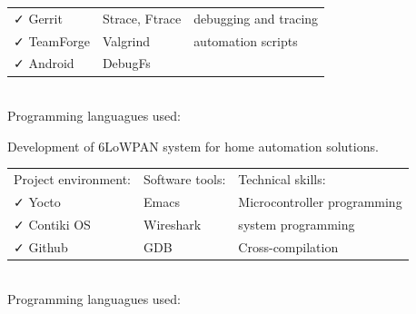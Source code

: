\documentclass[letterpaper]{jm-cv} %
\begin{document}
{\begin{tabular}{ l l l }
  {\color{mainblue}\faCheck} Gerrit &
  \hspace{1cm}{\color{maingreen}\faCheck} Strace, Ftrace &
  \hspace{1cm}{\color{maingray}\faCheck} debugging and tracing\\

  {\color{mainblue}\faCheck} TeamForge &
  \hspace{1cm}{\color{maingreen}\faCheck} Valgrind &
  \hspace{1cm}{\color{maingray}\faCheck} automation scripts \\

  {\color{mainblue}\faCheck} Android &
  \hspace{1cm}{\color{maingreen}\faCheck} DebugFs &

\end{tabular}\\

Programming languagues used:\\
}

\divider


\small {

  Development of 6LoWPAN system for home automation solutions.

\begin{tabular}{ l l l }
  Project environment: & \hspace{1cm}Software tools: & \hspace{1cm}Technical skills:\\
  {\color{mainblue}\faCheck} Yocto &
  \hspace{1cm}{\color{maingreen}\faCheck} Emacs &
  \hspace{1cm}{\color{maingray}\faCheck} Microcontroller programming\\

  {\color{mainblue}\faCheck} Contiki OS &
  \hspace{1cm}{\color{maingreen}\faCheck} Wireshark &
  \hspace{1cm}{\color{maingray}\faCheck} system programming\\

  {\color{mainblue}\faCheck} Github &
  \hspace{1cm}{\color{maingreen}\faCheck} GDB &
  \hspace{1cm}{\color{maingray}\faCheck} Cross-compilation\\

\end{tabular}\\

Programming languagues used:\\
}
\end{document}
